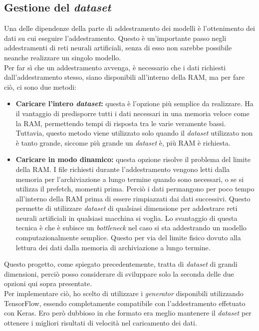 \subsection{Gestione del \textit{dataset}}\noindent
Una delle dipendenze della parte di addestramento dei modelli è l'ottenimento dei dati su cui eseguire l'addestramento. Questo è un'importante passo negli addestramenti di reti neurali artificiali, senza di esso non sarebbe possibile neanche realizzare un singolo modello.\\
Per far sì che un addestramento avvenga, è necessario che i dati richiesti dall'addestramento stesso, siano disponibili all'interno della RAM, ma per fare ciò, ci sono due metodi:
\begin{itemize}
    \item \textbf{Caricare l'intero \textit{dataset}:} questa è l'opzione più semplice da realizzare. Ha il vantaggio di predisporre tutti i dati necessari in una memoria veloce come la RAM, permettendo tempi di risposta tra le varie  veramente bassi. Tuttavia, questo metodo viene utilizzato solo quando il \textit{dataset} utilizzato non è tanto grande, siccome più grande un \textit{dataset} è, più RAM è richiesta.
    \item \textbf{Caricare in modo dinamico:} questa opzione risolve il problema del limite della RAM. I file richiesti durante l'addestramento vengono letti dalla memoria per l'archiviazione a lungo termine quando sono necessari, o se si utilizza il \gls{prefetch}, momenti prima. Perciò i dati permangono per poco tempo all'interno della RAM prima di essere rimpiazzati dai dati successivi. Questo permette di utilizzare \textit{dataset} di qualsiasi dimensione per addestrare reti neurali artificiali in qualsiasi macchina si voglia. Lo svantaggio di questa tecnica è che è subisce un \textit{bottleneck} nel caso si sta addestrando un modello computazionalmente semplice. Questo per via del limite fisico dovuto alla lettura dei dati dalla memoria di archiviazione a lungo termine.
\end{itemize}
Questo progetto, come spiegato precedentemente, tratta di \textit{dataset} di grandi dimensioni, perciò posso considerare di sviluppare solo la seconda delle due opzioni qui sopra presentate.\\
Per implementare ciò, ho scelto di utilizzare i \textit{generator} disponibili utilizzando TensorFlow, essendo completamente compatibile con l'addestramento effetuato con Keras. Ero però dubbioso in che formato era meglio mantenere il \textit{dataset} per ottenere i migliori risultati di velocità nel caricamento dei dati.\\
